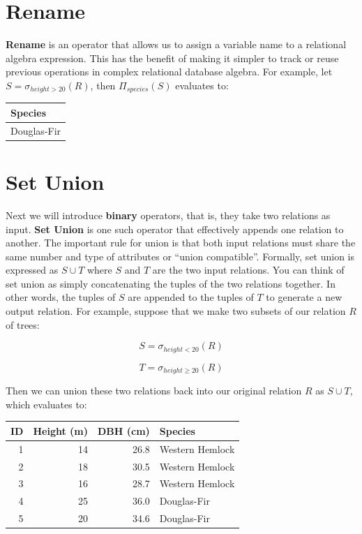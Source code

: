 \documentclass[
]{book}
\begin{document}
\hypertarget{rename}{%
\section{Rename}\label{rename}}

\textbf{Rename} is an operator that allows us to assign a variable name to a relational algebra expression. This has the benefit of making it simpler to track or reuse previous operations in complex relational database algebra. For example, let \(S = σ_{height>20}(R)\), then \(Π_{species}(S)\) evaluates to:

\begin{tabular}{l}
\toprule
Species\\
\midrule
Douglas-Fir\\
\bottomrule
\end{tabular}

\hypertarget{set-union}{%
\section{Set Union}\label{set-union}}

Next we will introduce \textbf{binary} operators, that is, they take two relations as input. \textbf{Set Union} is one such operator that effectively appends one relation to another. The important rule for union is that both input relations must share the same number and type of attributes or ``union compatible''. Formally, set union is expressed as \(S∪T\) where \(S\) and \(T\) are the two input relations. You can think of set union as simply concatenating the tuples of the two relations together. In other words, the tuples of \(S\) are appended to the tuples of \(T\) to generate a new output relation. For example, suppose that we make two subsets of our relation \(R\) of trees:

\[
S = σ_{height<20}(R)
\]

\[
T = σ_{height≥20}(R)
\]

Then we can union these two relations back into our original relation \(R\) as \(S∪T\), which evaluates to:

\begin{tabular}{rrrl}
\toprule
ID & Height (m) & DBH (cm) & Species\\
\midrule
1 & 14 & 26.8 & Western Hemlock\\
2 & 18 & 30.5 & Western Hemlock\\
3 & 16 & 28.7 & Western Hemlock\\
4 & 25 & 36.0 & Douglas-Fir\\
5 & 20 & 34.6 & Douglas-Fir\\
\bottomrule
\end{tabular}
\end{document}
